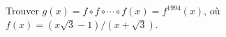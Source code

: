 Trouver $g(x) = f \circ f \circ \cdots \circ f(x) = f^{1994}(x)$, où $f(x) = (x\sqrt{3} - 1)/(x + \sqrt{3})$.
